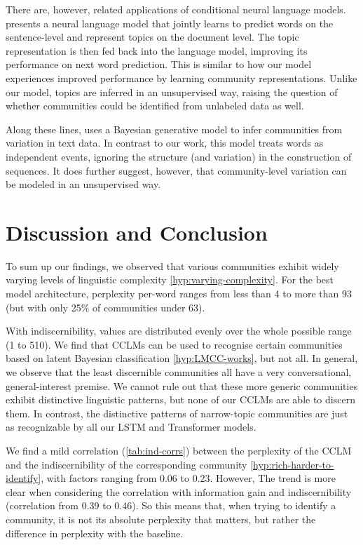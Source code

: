 \documentclass[11pt]{article}
\begin{document}
There are, however, related applications of conditional neural language models.
\citet{Lau2017a} presents a neural language model that jointly learns to predict
words on the sentence-level and represent topics on the document level.
The topic representation is then fed back into the language model, 
improving its performance on next word prediction.
This is similar to how our model experiences improved performance
by learning community representations. 
Unlike our model, topics are inferred in an unsupervised way, 
raising the question of whether communities could be identified from 
unlabeled data as well.

Along these lines, \citet{OConnor2010} uses a Bayesian generative
model to infer communities from variation in text data.  In contrast
to our work, this model treats words as independent events, ignoring
the structure (and variation) in the construction of sequences.  It
does further suggest, however, that community-level variation can be
modeled in an unsupervised way.

\section{Discussion and Conclusion}\label{sec:discussion-conclusion}


To sum up our findings, 
we observed that various communities exhibit widely varying levels of
linguistic complexity \ref{hyp:varying-complexity}. For the best model architecture,
perplexity per-word ranges from less than \num{4} to more than \num{93} 
(but with only 25\% of communities under 63).

With indiscernibility, values are distributed evenly over the whole possible
range (1 to 510). We find that CCLMs can be used to recognise certain
communities based on latent Bayesian classification
\ref{hyp:LMCC-works}, but not all.  In general, we observe that the least
discernible communities all have a very conversational, general-interest
premise. We cannot rule out that these more generic
communities exhibit distinctive linguistic patterns, but none of our
CCLMs are able to discern them. In contrast, the distinctive patterns
of narrow-topic communities are just as recognizable by all our LSTM
and Transformer models.

We find a mild correlation (\cref{tab:ind-corrs}) between the
perplexity of the CCLM and the indiscernibility of the corresponding
community \ref{hyp:rich-harder-to-identify}, with factors ranging from
0.06 to 0.23. However, The trend is more clear when considering the
correlation with information gain and indiscernibility (correlation
from 0.39 to 0.46). So this means that, when trying to identify a
community, it is not its absolute perplexity that matters, but rather
the difference in perplexity with the baseline.
\end{document}
